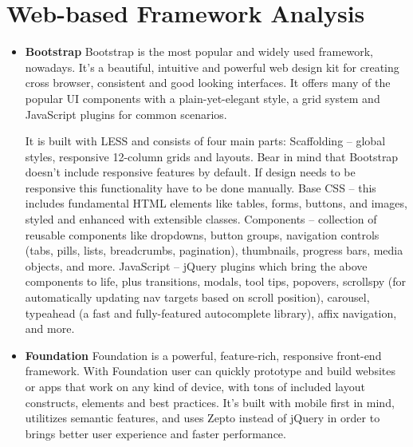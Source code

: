 \section{Web-based Framework Analysis}
 \begin{itemize}
\item \textbf{Bootstrap}
\newline
Bootstrap is the most popular and widely used framework, nowadays. It’s a beautiful, intuitive and powerful web design kit for creating cross browser, consistent and good looking interfaces. It offers many of the popular UI components with a plain-yet-elegant style, a grid system and JavaScript plugins for common scenarios.

It is built with LESS and consists of four main parts:
Scaffolding – global styles, responsive 12-column grids and layouts. Bear in mind that Bootstrap doesn’t include responsive features by default. If design needs to be responsive this functionality have to be done manually.
Base CSS – this includes fundamental HTML elements like tables, forms, buttons, and images, styled and enhanced with extensible classes.
Components – collection of reusable components like dropdowns, button groups, navigation controls (tabs, pills, lists, breadcrumbs, pagination), thumbnails, progress bars, media objects, and more.
JavaScript – jQuery plugins which bring the above components to life, plus transitions, modals, tool tips, popovers, scrollspy (for automatically updating nav targets based on scroll position), carousel, typeahead (a fast and fully-featured autocomplete library), affix navigation, and more.
\item \textbf{Foundation}
\newline
Foundation is a powerful, feature-rich, responsive front-end framework. With Foundation user can quickly prototype and build websites or apps that work on any kind of device, with tons of included layout constructs, elements and best practices. It’s built with mobile first in mind, utilitizes semantic features, and uses Zepto instead of jQuery in order to brings better user experience and faster performance.


\end{itemize}
